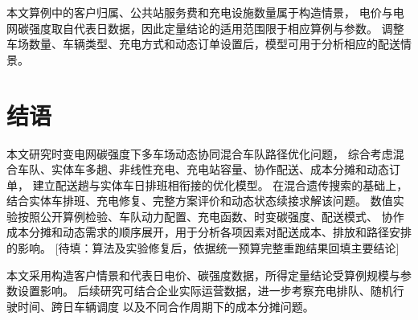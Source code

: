 \documentclass{setp-new}
\DeclareRobustCommand{\TBD}[1]{%
  \begingroup\setlength{\fboxsep}{1.2pt}%
  \colorbox{black!12}{\textcolor{black!65}{\textsf{\footnotesize[待填：#1]}}}%
  \endgroup}
\begin{document}
本文算例中的客户归属、公共站服务费和充电设施数量属于构造情景，
电价与电网碳强度取自代表日数据，因此定量结论的适用范围限于相应算例与参数。
调整车场数量、车辆类型、充电方式和动态订单设置后，模型可用于分析相应的配送情景。

\section{结语}

本文研究时变电网碳强度下多车场动态协同混合车队路径优化问题，
综合考虑混合车队、实体车多趟、非线性充电、充电站容量、协作配送、成本分摊和动态订单，
建立配送趟与实体车日排班相衔接的优化模型。
在混合遗传搜索的基础上，结合实体车排班、充电修复、完整方案评价和动态状态续接求解该问题。
数值实验按照公开算例检验、车队动力配置、充电函数、时变碳强度、配送模式、
协作成本分摊和动态需求的顺序展开，用于分析各项因素对配送成本、排放和路径安排的影响。
\TBD{算法及实验修复后，依据统一预算完整重跑结果回填主要结论}

本文采用构造客户情景和代表日电价、碳强度数据，所得定量结论受算例规模与参数设置影响。
后续研究可结合企业实际运营数据，进一步考察充电排队、随机行驶时间、跨日车辆调度
以及不同合作周期下的成本分摊问题。
\end{document}
